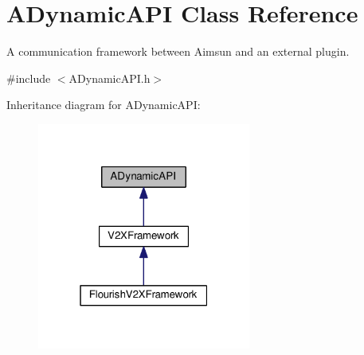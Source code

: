 \hypertarget{classADynamicAPI}{}\section{A\+Dynamic\+A\+PI Class Reference}
\label{classADynamicAPI}


A communication framework between Aimsun and an external plugin.  




{\ttfamily \#include $<$A\+Dynamic\+A\+P\+I.\+h$>$}



Inheritance diagram for A\+Dynamic\+A\+PI\+:\nopagebreak
\begin{figure}[H]
\begin{center}
\leavevmode
\includegraphics[width=199pt]{classADynamicAPI__inherit__graph}
\end{center}
\end{figure}
